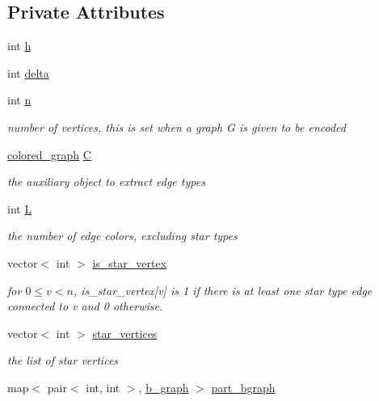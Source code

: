 \subsection*{Private Attributes}
\begin{DoxyCompactItemize}
\item 
int \hyperlink{classmarked__graph__encoder_ae7f8872c57d2d64e4ca6cc47387b9b58}{h}
\item 
int \hyperlink{classmarked__graph__encoder_a29dcf42526b12cf7964a556bb1025c9b}{delta}
\item 
int \hyperlink{classmarked__graph__encoder_a4c66d9fdbc14c97523715aac7e4511cb}{n}
\begin{DoxyCompactList}\small\item\em number of vertices, this is set when a graph G is given to be encoded \end{DoxyCompactList}\item 
\hyperlink{classcolored__graph}{colored\+\_\+graph} \hyperlink{classmarked__graph__encoder_af82bc0653414091291cb75553a407bdb}{C}
\begin{DoxyCompactList}\small\item\em the auxiliary object to extract edge types \end{DoxyCompactList}\item 
int \hyperlink{classmarked__graph__encoder_a0f2e2dd184fe262f6fc93f375215227e}{L}
\begin{DoxyCompactList}\small\item\em the number of edge colors, excluding star types \end{DoxyCompactList}\item 
vector$<$ int $>$ \hyperlink{classmarked__graph__encoder_a4ce8d85a7b63aed1272ec9824710ce45}{is\+\_\+star\+\_\+vertex}
\begin{DoxyCompactList}\small\item\em for $0 \leq v < n$, is\+\_\+star\+\_\+vertex\mbox{[}v\mbox{]} is 1 if there is at least one star type edge connected to v and 0 otherwise. \end{DoxyCompactList}\item 
vector$<$ int $>$ \hyperlink{classmarked__graph__encoder_a08fdf6fcd7dcd8c5d1667f2d7ff06c2c}{star\+\_\+vertices}
\begin{DoxyCompactList}\small\item\em the list of star vertices \end{DoxyCompactList}\item 
map$<$ pair$<$ int, int $>$, \hyperlink{classb__graph}{b\+\_\+graph} $>$ \hyperlink{classmarked__graph__encoder_a5faebef707fb681c0b6c2ccf64abc04c}{part\+\_\+bgraph}

\end{DoxyCompactItemize}
